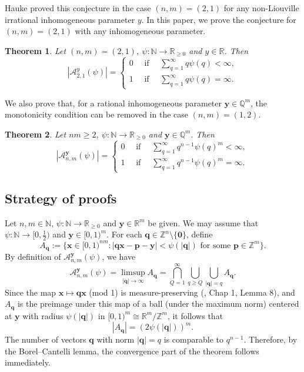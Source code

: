 \documentclass[reqno]{amsart}
\newtheorem{theorem}{Theorem}
\theoremstyle{definition}
\theoremstyle{remark}
\begin{document}
Hauke \cite{Hau23} proved this conjecture in the case $(n,m) = (2,1)$ for any non-Liouville irrational inhomogeneous parameter $y$. In this paper, we prove the conjecture for $(n,m)=(2,1)$ with any inhomogeneous parameter.

\begin{theorem}\label{thm1}
    Let $(n,m) = (2,1),\ \psi: \mathbb{N} \to \mathbb{R}_{\geq 0}$ and $y \in \mathbb{R}$. Then
    $$|\mathscr{A}_{2,1}^y (\psi)| = \begin{cases}  0  \quad \text{ if } \quad \sum_{q=1}^\infty q \psi(q) < \infty, \\ 1 \quad \text{ if } \quad \sum_{q=1}^\infty q \psi(q) = \infty. \end{cases}$$
\end{theorem}
We also prove that, for a rational inhomogeneous parameter $\mathbf{y} \in \mathbb{Q}^m$, the monotonicity condition can be removed in the case $(n,m) = (1,2)$.
\begin{theorem}\label{thm2}
    Let $nm \geq 2,\ \psi: \mathbb{N} \to \mathbb{R}_{\geq 0}$ and $\mathbf{y} \in \mathbb{Q}^m.$ Then
    $$|\mathscr{A}_{n,m}^\mathbf{y} (\psi)| = \begin{cases}  0  \quad \text{ if } \quad \sum_{q=1}^\infty q^{n-1} \psi(q)^m < \infty, \\ 1 \quad \text{ if } \quad \sum_{q=1}^\infty q^{n-1} \psi(q)^m = \infty. \end{cases}$$
\end{theorem}


\vspace{.1cm}
\subsection{Strategy of proofs} Let $n,m \in \mathbb{N}$, $\psi : \mathbb{N} \to \mathbb{R}_{\geq 0}$ and $\mathbf{y} \in \mathbb{R}^m$ be given. We may assume that $\psi : \mathbb{N} \to [0,\frac{1}{2})$ and $\mathbf{y} \in [0,1)^m$. For each $\mathbf{q} \in \mathbb{Z}^n \setminus \{\mathbf{0}\}$, define
$$A_\mathbf{q} := \{\mathbf x \in [0,1)^{nm} : |\mathbf{qx} - \mathbf{p} - \mathbf{y}| < \psi(|\mathbf{q}|) \text{ for some } \mathbf{p} \in \mathbb{Z}^m\}.$$
By definition of $\mathscr{A}_{n,m}^\mathbf{y} (\psi)$, we have
$$\mathscr{A}_{n,m}^\mathbf{y} (\psi) = \limsup_{|\mathbf{q}| \to \infty} A_\mathbf{q} = \bigcap_{Q=1}^\infty \bigcup_{q\geq Q} \bigcup_{|\mathbf{q}| = q} A_\mathbf{q} .$$
Since the map $\mathbf{x} \mapsto \mathbf{qx}$ (mod 1) is measure-preserving (\cite{Spr79}, Chap 1, Lemma 8), and $A_\mathbf{q}$ is the preimage under this map of a ball (under the maximum norm) centered at $\mathbf{y}$ with radius $\psi(|\mathbf{q}|)$ in $[0,1)^{m} \cong \mathbb{R}^m/\mathbb{Z}^m$, it follows that
$$|A_\mathbf{q}| = (2\psi(|\mathbf{q}|))^m.$$
The number of vectors $\mathbf{q}$ with norm $|\mathbf{q}| = q$ is comparable to $q^{n-1}$. Therefore, by the Borel--Cantelli lemma, the convergence part of the theorem follows immediately.
\end{document}
